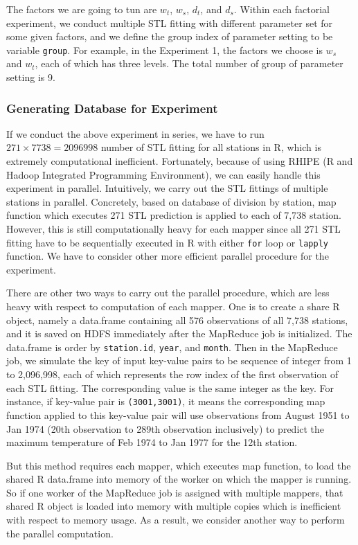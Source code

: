 The factors we are going to tun are $w_t$, $w_s$, $d_t$, 
and $d_s$. Within each factorial experiment, we conduct multiple STL fitting with 
different parameter set for some given factors, and we define the group index of 
parameter setting to be variable \texttt{group}. For example, in the Experiment 1,
the factors we choose is $w_s$ and $w_t$, each of which has three levels. The 
total number of group of parameter setting is 9.

\subsubsection{Generating Database for Experiment}

If we conduct the above experiment in series, we have to run 
$271 \times 7738 = 2096998$ number of STL fitting for all stations in R, which is 
extremely computational inefficient. Fortunately, because of using RHIPE
(R and Hadoop Integrated Programming Environment), we can easily handle this 
experiment in parallel. Intuitively, we carry out the STL fittings of multiple 
stations in parallel. Concretely, based on database of division by station, map
function which executes 271 STL prediction is applied to each of 7,738 station.
However, this is still computationally heavy for each mapper since all 271 STL 
fitting have to be sequentially executed in R with either \texttt{for} loop or 
\texttt{lapply} function. We have to consider other more efficient parallel 
procedure for the experiment.

There are other two ways to carry out the parallel procedure, which are less 
heavy with respect to computation of each mapper. One is to create a share
R object, namely a data.frame containing all 576 observations of all 7,738 
stations, and it is saved on HDFS immediately after the MapReduce job is 
initialized. The data.frame is order by \texttt{station.id}, \texttt{year}, and
\texttt{month}. Then in the MapReduce job, we simulate the key of input key-value
pairs to be sequence of integer from 1 to 2,096,998, each of which represents the
row index of the first observation of each STL fitting. The corresponding value 
is the same integer as the key. For instance, if key-value pair is 
\texttt{(3001,3001)}, it means the corresponding map function applied to this 
key-value pair will use observations from August 1951 to Jan 1974 (20th observation
to 289th observation inclusively) to predict the maximum temperature of Feb 1974
to Jan 1977 for the 12th station.

But this method requires each mapper, which executes map function, to load the
shared R data.frame into memory of the worker on which the mapper is running. So
if one worker of the MapReduce job is assigned with multiple mappers, that shared
R object is loaded into memory with multiple copies which is inefficient with
respect to memory usage. As a result, we consider another way to perform the 
parallel computation. 

